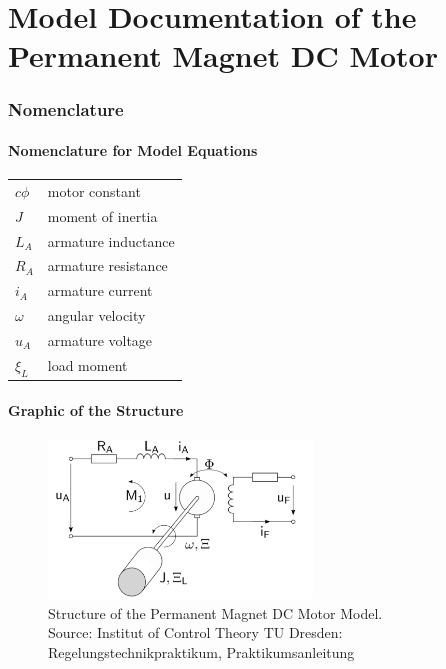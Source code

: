 \documentclass[10pt,a4paper]{article}
\begin{document}
	\part*{Model Documentation of the \\ Permanent Magnet DC Motor} %
	
	
	\section{Nomenclature} %
	\subsection{Nomenclature for Model Equations} %
	
	\begin{tabular}{ll}
		$c\phi$ & motor constant \\
		$J$ & moment of inertia \\
		$L_A$ & armature inductance \\
		$R_A$ & armature resistance \\
		$i_A$ & armature current \\
		$\omega$ & angular velocity \\
		$u_A$ & armature voltage \\
		$\xi_L$ & load moment \\
				
	\end{tabular}
	 
	
	\subsection{Graphic of the Structure}	
	\begin{figure}[H]
		\centering
		\captionsetup{justification=centering, margin=1cm}
		\includegraphics[width=70mm]{motor.pdf}
		\caption{Structure of the Permanent Magnet DC Motor Model. \\ \footnotesize{Source: Institut of Control Theory TU Dresden: Regelungstechnikpraktikum, Praktikumsanleitung}}
	\end{figure}
	
\end{document}
